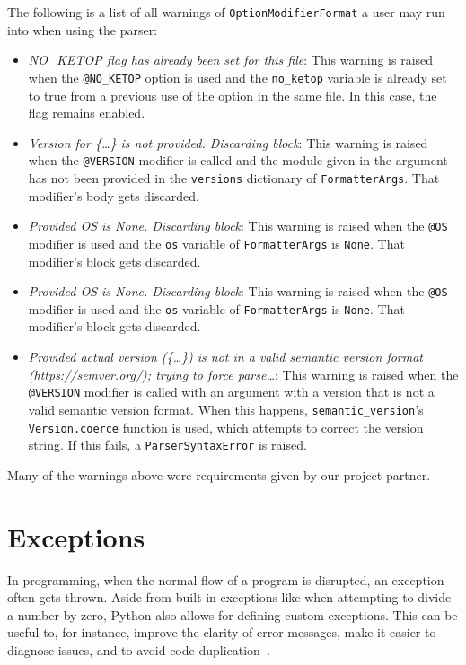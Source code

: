The following is a list of all warnings of \verb|OptionModifierFormat| a user may run into when using the parser:

\begin{itemize}
    \item \textit{NO\_KETOP flag has already been set for this file}: This warning is raised when the \verb|@NO_KETOP| option is used and the \verb|no_ketop| variable is already set to true from a previous use of the option in the same file. In this case, the flag remains enabled. 
    \item \textit{Version for \{\ldots\} is not provided. Discarding block}: This warning is raised when the \verb|@VERSION| modifier is called and the module given in the argument has not been provided in the \verb|versions| dictionary of \verb|FormatterArgs|. That modifier's body gets discarded.
    \item \textit{Provided OS is None. Discarding block}: This warning is raised when the \verb|@OS| modifier is used and the \verb|os| variable of \verb|FormatterArgs| is \verb|None|. That modifier's block gets discarded.
    \item \textit{Provided OS is None. Discarding block}: This warning is raised when the \verb|@OS| modifier is used and the \verb|os| variable of \verb|FormatterArgs| is \verb|None|. That modifier's block gets discarded.
    \item \textit{Provided actual version (\{\ldots\}) is not in a valid semantic version format (https://semver.org/); trying to force parse\ldots}: This warning is raised when the \verb|@VERSION| modifier is called with an argument with a version that is not a valid semantic version format. When this happens, \verb|semantic_version|'s \verb|Version.coerce| function is used, which attempts to correct the version string. If this fails, a \verb|ParserSyntaxError| is raised.
\end{itemize}

Many of the warnings above were requirements given by our project partner.

\section{Exceptions}

In programming, when the normal flow of a program is disrupted, an exception often gets thrown. Aside from built-in exceptions like when attempting to divide a number by zero, Python also allows for defining custom exceptions. This can be useful to, for instance, improve the clarity of error messages, make it easier to diagnose issues, and to avoid code duplication~\cite{py-exceptions}. 

